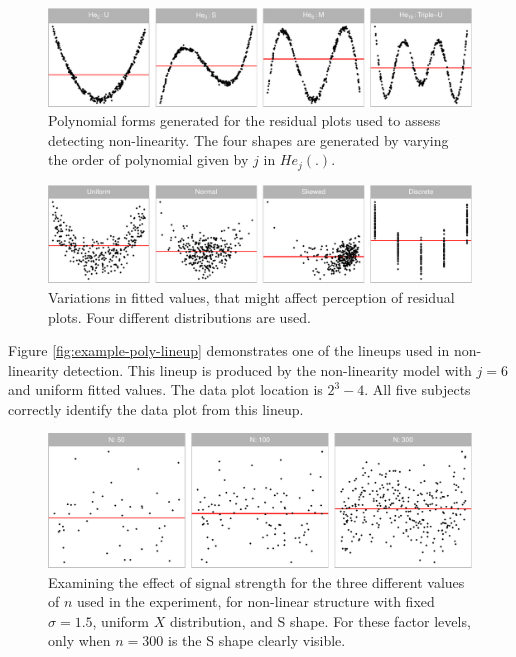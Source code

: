 \documentclass[]{interact}
\theoremstyle{plain}%
\theoremstyle{definition}
\theoremstyle{remark}
\begin{document}
\begin{figure}

{\centering \includegraphics[width=1\linewidth]{paper_comparison_files/figure-latex/different-shape-of-herimite-1} 

}

\caption{Polynomial forms generated for the residual plots used to assess detecting non-linearity. The four shapes are generated by varying the order of polynomial given by $j$ in $He_j(.)$.}\label{fig:different-shape-of-herimite}
\end{figure}

\begin{figure}

{\centering \includegraphics[width=1\linewidth]{paper_comparison_files/figure-latex/different-dist-1} 

}

\caption{Variations in fitted values, that might affect perception of residual plots. Four different distributions are used.}\label{fig:different-dist}
\end{figure}

Figure \ref{fig:example-poly-lineup} demonstrates one of the lineups
used in non-linearity detection. This lineup is produced by the
non-linearity model with \(j = 6\) and uniform fitted values. The data
plot location is \(2^3 - 4\). All five subjects correctly identify the
data plot from this lineup.

\begin{figure}

{\centering \includegraphics[width=1\linewidth]{paper_comparison_files/figure-latex/different-n-1} 

}

\caption{Examining the effect of signal strength for the three different values of $n$ used in the experiment, for non-linear structure with fixed $\sigma = 1.5$, uniform $X$ distribution, and S shape. For these factor levels, only when $n=300$ is the S shape clearly visible.}\label{fig:different-n}
\end{figure}
\end{document}
